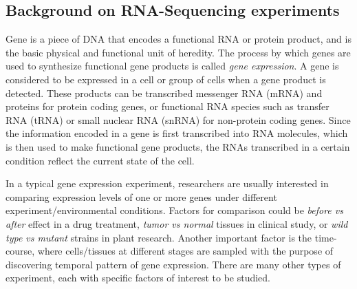 \subsection{Background on RNA-Sequencing experiments}

Gene is a piece of DNA that encodes a functional RNA or protein product, and is the basic physical
and functional unit of heredity. The process by which genes are used to synthesize functional gene
products is called \textit{gene expression}.  A gene is considered to be expressed in a cell or
group of cells when a gene product is detected.
These products can be transcribed messenger RNA (mRNA) and proteins for protein coding genes, or
functional RNA species such as transfer RNA (tRNA) or small nuclear RNA (snRNA) for non-protein
coding genes.
Since the information encoded in a gene is first transcribed into RNA molecules, which is then used
to make functional gene products, the RNAs transcribed
in a certain condition reflect the current state of the cell.




In a typical gene expression experiment, researchers are usually interested in comparing expression
levels of one or more genes under different experiment/environmental conditions. Factors for 
comparison could be \textit{before vs after} effect in a drug treatment, \textit{tumor vs normal} 
tissues in clinical study, or \textit{wild type vs mutant} strains in plant research. Another 
important factor is the time-course, where cells/tissues at different stages are sampled with the 
purpose of discovering temporal pattern of gene expression. There are many other types of 
experiment, each with specific factors of interest to be studied.


